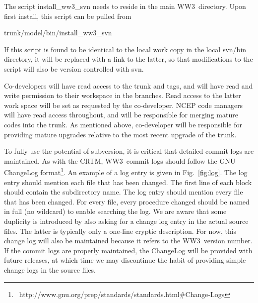 \documentclass[12pt]{article}
\newcommand{\ws}{WW3}
\newcommand{\file}{\sf}
\begin{document}
The script {\file install\_ww3\_svn} needs to reside in the main \ws\
directory. Upon first install, this script can be pulled from

\vspace{\baselineskip}
\centerline{\file trunk/model/bin/install\_ww3\_svn}
\vspace{\baselineskip}

\noindent
If this script is found to be identical to the local work copy in the local
{\file svn/bin} directory, it will be replaced with a link to the latter, so
that modifications to the script will also be version controlled with svn.

Co-developers will have read access to the {\file trunk} and {\file tags}, and
will have read and write permission to their workspace in the {\file
branches}. Read access to the latter work space will be set as requested by
the co-developer. NCEP code managers will have read access throughout, and
will be responsible for merging mature codes into the {\file trunk}. As
mentioned above, co-developer will be responsible for providing mature
upgrades relative to the most recent upgrade of the {\file trunk}.

To fully use the potential of subversion, it is critical that detailed commit
logs are maintained. As with the CRTM, \ws\ commit logs should follow the GNU
ChangeLog format\footnote{
~http://www.gnu.org/prep/standards/standards.html\#Change-Logs}. An example of
a log entry is given in Fig.~\ref{fig:log}. The log entry should mention each
file that has been changed. The first line of each block should contain the
subdirectory name. The log entry should mention every file that has been
changed. For every file, every procedure changed should be named in full (no
wildcard) to enable searching the log. We are aware that some duplicity is
introduced by also asking for a change log entry in the actual source
files. The latter is typically only a one-line cryptic description. For now,
this change log will also be maintained because it refers to the \ws\ version
number. If the commit logs are properly maintained, the ChangeLog will be
provided with future releases, at which time we may discontinue the habit of
providing simple change logs in the source files.
\end{document}
